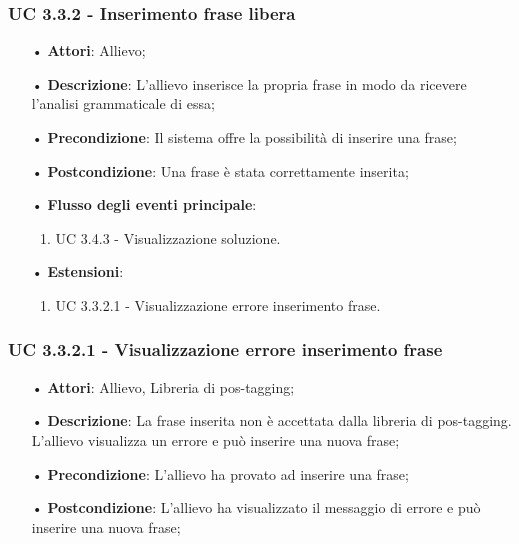 \subsubsection{UC 3.3.2 - Inserimento frase libera}
\begin{itemize}
\item[•]\textbf{Attori}: Allievo;
\item[•]\textbf{Descrizione}: L’allievo inserisce la propria frase in modo da ricevere l’analisi grammaticale di essa;
\item[•]\textbf{Precondizione}: Il sistema offre la possibilità di inserire una frase;
\item[•]\textbf{Postcondizione}: Una frase è stata correttamente inserita;
\item[•]\textbf{Flusso degli eventi principale}:
\begin{enumerate}
\item UC 3.4.3 - Visualizzazione soluzione.
\end{enumerate}
\item[•]\textbf{Estensioni}:
\begin{enumerate}
\item UC 3.3.2.1 - Visualizzazione errore inserimento frase.
\end{enumerate}
\end{itemize}

\subsubsection{UC 3.3.2.1 - Visualizzazione errore inserimento frase}
\begin{itemize}
\item[•]\textbf{Attori}: Allievo, Libreria di pos-tagging;
\item[•]\textbf{Descrizione}: La frase inserita non è accettata dalla libreria di pos-tagging. L'allievo visualizza un errore e può inserire una nuova frase;
\item[•]\textbf{Precondizione}: L’allievo ha provato ad inserire una frase;
\item[•]\textbf{Postcondizione}: L’allievo ha visualizzato il messaggio di errore e può inserire una nuova frase;
\end{itemize}

